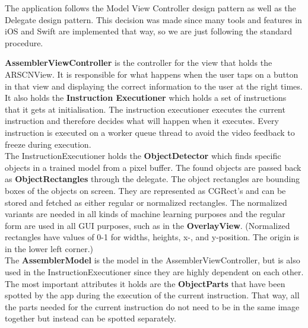 The application follows the Model View Controller design pattern as well as the Delegate design pattern.
This decision was made since many tools and features in iOS and Swift are implemented that way,
so we are just following the standard procedure.

\textbf{AssemblerViewController} is the controller for the view that holds the ARSCNView.
It is responsible for what happens when the user taps on a button in that view and displaying the correct
information to the user at the right times. It also holds the \textbf{Instruction Executioner} which holds a 
set of instructions that it gets at initialisation. The instruction executioner executes the current
instruction and therefore decides what will happen when it executes. Every instruction is executed on a worker queue thread to avoid the video feedback to freeze during execution.\\

The InstructionExecutioner holds the \textbf{ObjectDetector} which finds specific objects in a 
trained model from a pixel buffer. The found objects are passed back as \textbf{ObjectRectangles} through the delegate. The object rectangles are bounding boxes
of the objects on screen. They are represented as CGRect's and can be stored and fetched as
either regular or normalized rectangles. The normalized variants are needed in all kinds of machine learning purposes and the regular form are used in all GUI purposes, such as in the \textbf{OverlayView}. (Normalized 
rectangles have values of 0-1 for widths, heights, x-, and y-position. The origin is in the lower left 
corner.)\\

The \textbf{AssemblerModel} is the model in the AssemblerViewController, but is also used in the InstructionExecutioner since they are highly dependent on each other.
The most important attributes it holds are the \textbf{ObjectParts} that have been spotted by the 
app during the execution of the current instruction.
That way, all the parts needed for the current instruction do not need to be in the same image 
together but instead can be spotted separately.\\

